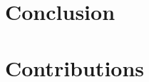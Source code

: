 \documentclass{article}
\begin{document}

\section{Conclusion}


\cite{langley00}
\cite{knuthwebsite}





\section{Contributions}
\end{document}
